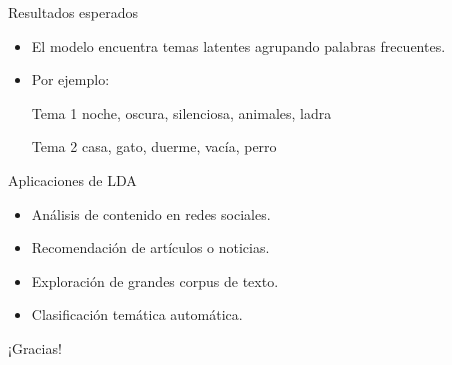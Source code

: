 \documentclass{beamer}
\begin{document}
\begin{frame}{Resultados esperados}
  \begin{itemize}
    \item El modelo encuentra temas latentes agrupando palabras frecuentes.
    \item Por ejemplo:
    \begin{block}{Tema 1}
      noche, oscura, silenciosa, animales, ladra
    \end{block}
    \begin{block}{Tema 2}
      casa, gato, duerme, vacía, perro
    \end{block}
  \end{itemize}
\end{frame}

\begin{frame}{Aplicaciones de LDA}
  \begin{itemize}
    \item Análisis de contenido en redes sociales.
    \item Recomendación de artículos o noticias.
    \item Exploración de grandes corpus de texto.
    \item Clasificación temática automática.
  \end{itemize}
\end{frame}

\begin{frame}
  \centering
  \Huge ¡Gracias!
\end{frame}
\end{document}
